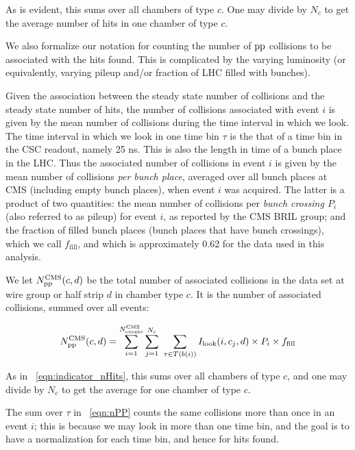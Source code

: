 As is evident, this sums over all chambers of type $c$.  One may divide by
$N_c$ to get the average number of hits in one chamber of type $c$.

%
We also formalize our notation for counting the number of $\mathrm{p}\mathrm{p}$
collisions to be associated with the hits found.  This is complicated
by the varying luminosity (or equivalently, varying pileup and/or
fraction of LHC filled with bunches).

Given the association between the steady state number of \pp
collisions and the steady state number of hits, the number of \pp
collisions associated with event $i$ is given by the mean number
of \pp collisions during the time interval in which we look.  The time
interval in which we look in one time bin $\tau$ is the that of a time
bin in the CSC readout, namely 25 ns.  This is also the length in time
of a bunch place in the LHC.  Thus the associated number of \pp
collisions in event $i$ is given by the mean
number of \pp collisions \emph{per bunch place}, averaged over all
bunch places at CMS (including empty bunch places), when event $i$ was
acquired.
The latter is a product of two quantities: the mean number
of \pp collisions per {\em bunch crossing $P_i$} (also referred to as
pileup) for event $i$, as reported by the CMS BRIL group;
and the fraction of filled bunch places (bunch places that have bunch crossings),
which we call $f_\text{fill}$, and which is
approximately 0.62 for the data used in this analysis. 

We let $N^\text{CMS}_{\text{\ensuremath{\mathrm{p}}\ensuremath{\mathrm{p}}}}(c, d)$ be
the total number of associated \pp collisions 
in the data set at wire group or half strip $d$ in chamber type
$c$. It is the number of associated \pp collisions, summed over all events:

\begin{equation}
        \label{eqn:nPP}	
	N^\text{CMS}_\text{\pp}(c, d) = 
        \sum_{i=1}^{N^\text{CMS}_\text{events}}
        \sum_{j=1}^{N_c} \ 
        \sum_{\tau\in T(b(i))}
        I_\text{look}(i, c_j, d) \times
        P_i \times f_\text{fill}
\end{equation}

As in \Eq~\ref{eqn:indicator_nHits},
this sums over all chambers of type $c$, and one may divide by
$N_c$ to get the average for one chamber of type $c$.

The sum over $\tau$ in \Eq~\ref{eqn:nPP} counts the same \pp
collisions more than once in an event $i$; this is because we may look
in more than one time bin, and the goal is to have a normalization for
each time bin, and hence for hits found.

